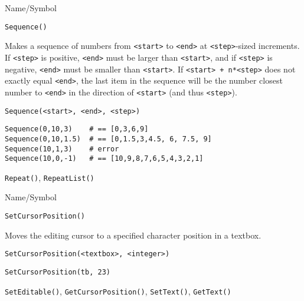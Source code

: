 \rl


\begin{desc}{Name/Symbol}
\item[Name/Symbol]   	\verb+Sequence()+

\item[Description] Makes a sequence of numbers from \verb+<start>+ to
  \verb+<end>+ at \verb+<step>+-sized increments. If \verb+<step>+ is
  positive, \verb+<end>+ must be larger than \verb+<start>+, and if
  \verb+<step>+ is negative, \verb+<end>+ must be smaller than
  \verb+<start>+. If \verb!<start> + n*<step>! does not exactly equal
  \verb+<end>+, the last item in the sequence will be the number
  closest number to \verb+<end>+ in the direction of \verb+<start>+
  (and thus \verb+<step>+).

\item[Usage] 
\begin{verbatim}
Sequence(<start>, <end>, <step>)
\end{verbatim}

\item[Example]
\begin{verbatim}
Sequence(0,10,3)    # == [0,3,6,9]
Sequence(0,10,1.5)  # == [0,1.5,3,4.5, 6, 7.5, 9]
Sequence(10,1,3)    # error
Sequence(10,0,-1)   # == [10,9,8,7,6,5,4,3,2,1]
\end{verbatim}

\item[See Also]    	\verb+Repeat()+, \verb+RepeatList()+
\end{desc}

\rl


\begin{desc}{Name/Symbol}
\item[Name/Symbol] 	\verb+SetCursorPosition()+

\item[Description] 	Moves the editing cursor to a specified character
		position in a textbox.

\item[Usage]
\begin{verbatim}
SetCursorPosition(<textbox>, <integer>)
\end{verbatim}

\item[Example]
\begin{verbatim}
SetCursorPosition(tb, 23)
\end{verbatim}

\item[See Also]   	\verb+SetEditable()+, \verb+GetCursorPosition()+, \verb+SetText()+, \verb+GetText()+
\end{desc}

